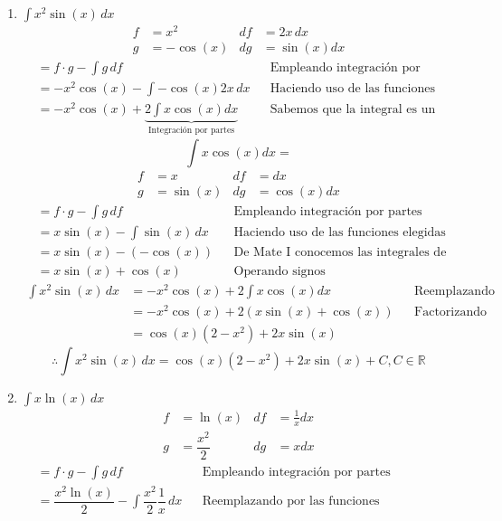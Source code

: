 \documentclass[letterpaper]{article}
\newcommand{\R}{\mathds{R}}
\renewcommand{\*}{\cdot}
\theoremstyle{definition}
\begin{document}
\begin{enumerate}
\begin{enumerate}
	\item$\displaystyle \int x^2 \sin(x) \, dx$
	\begin{align*}
		f &= x^2 & df &=2x\,dx \\
		g &= -\cos(x) & dg &= \sin(x)dx
	\end{align*}
	\begin{align*}
		&= f \* g - \int g\,df &&\text{Empleando integración por partes}\\
		&= -x^2\cos(x) - \int -\cos(x)2x\,dx &&\text{Haciendo uso de las funciones elegidas}\\
		&= -x^2\cos(x) + \underbrace{2\int x\cos(x)dx}_\text{Integración por partes} &&\text{Sabemos que la integral es un operador lineal}
	\end{align*}
	\[ \int x\cos(x)dx = \]
	\begin{align*}
		f &= x & df &=dx \\
		g &= \sin(x) & dg &= \cos(x)dx
	\end{align*}
	\begin{align*}
		&= f \* g - \int g\,df &&\text{Empleando integración por partes}\\
		&= x\sin(x) - \int \sin(x)\,dx &&\text{Haciendo uso de las funciones elegidas}\\
		&= x\sin(x) - (-\cos(x)) &&\text{De Mate I conocemos las integrales de las f. trigonométricas}\\
		&= x\sin(x) + \cos(x) &&\text{Operando signos}
	\end{align*}
	\begin{align*}
		\int x^2 \sin(x) \, dx &= -x^2\cos(x) + 2\int x\cos(x)dx &&\text{Reemplazando en el resultado anterior}\\
		&= -x^2\cos(x) + 2(x\sin(x) + \cos(x)) &&\text{Factorizando }\\
		&= \cos(x)(2 -x^2) +2x\sin(x) &&\text{ }
	\end{align*}
	\[ \therefore 	\int x^2 \sin(x) \, dx = \cos(x)(2 -x^2) +2x\sin(x)  + C, C \in \R \]
	 \newpage
	\item$\displaystyle \int x \ln(x) \, dx$
	\begin{align*}
		f &= \ln(x) & df &=\frac{1}{x}dx \\
		g &= \dfrac{x^2}{2} & dg &= xdx
	\end{align*}
	\begin{align*}
		&= f \* g - \int g\,df &&\text{Empleando integración por partes}\\
		&= \dfrac{x^2\ln(x)}{2} - \int \dfrac{x^2}{2}\dfrac{1}{x}\,dx && \text{Reemplazando por las funciones seleccionadas}\\

\end{align*}
\end{enumerate}
\end{enumerate}
\end{document}
